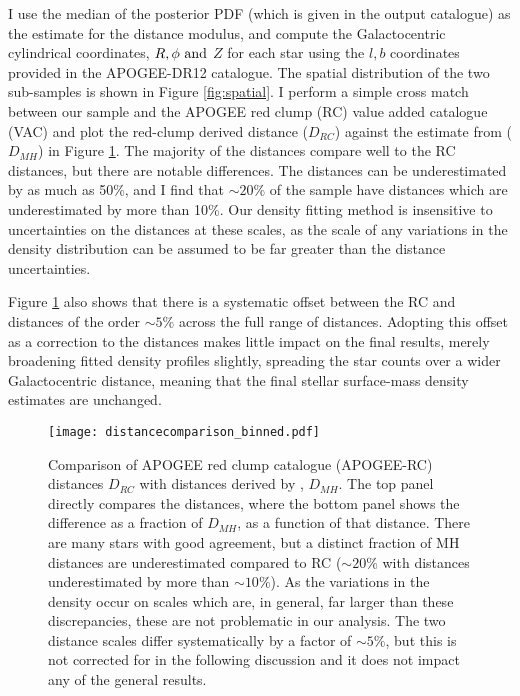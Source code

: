 I use the median of the posterior PDF (which is given in the output catalogue) as the estimate for the distance modulus, and compute the Galactocentric cylindrical coordinates, $R, \phi\ \rm{and}$  $Z$ for each star using the $l,b$ coordinates provided in the APOGEE-DR12 catalogue. The spatial distribution of the two \afe{} sub-samples is shown in Figure \ref{fig:spatial}. I perform a simple cross match between our sample and the APOGEE red clump (RC) value added catalogue (VAC) \citep{2014ApJ...790..127B} and plot the red-clump derived distance ($D_{RC}$) against the estimate from \citet{2014AJ....147..116H} ($D_{MH}$) in Figure \ref{fig:distcomp}. The majority of the \citet{2014AJ....147..116H} distances compare well to the RC distances, but there are notable differences. The \citet{2014AJ....147..116H} distances can be underestimated by as much as 50\%, and I find that $\sim20\%$ of the sample have distances which are underestimated by more than 10\%. Our density fitting method is insensitive to uncertainties on the distances at these scales, as the scale of any variations in the density distribution can be assumed to be far greater than the distance uncertainties. 

 Figure \ref{fig:distcomp} also shows that there is a systematic offset between the RC and \citet{2014AJ....147..116H} distances of the order $\sim 5\%$ across the full range of distances. Adopting this offset as a correction to the distances makes little impact on the final results, merely broadening fitted density profiles slightly, spreading the star counts over a wider Galactocentric distance, meaning that the final stellar surface-mass density estimates are unchanged.

\begin{figure}
 	\texttt{[image: distancecomparison\_binned.pdf]}
    \caption[Comparison of APOGEE RC catalogue distances with distances derived by \citet{2015ApJ...808..132H}, as used in Chapter \ref{chapter:apogeestruc}]{Comparison of APOGEE red clump catalogue (APOGEE-RC) distances $D_{RC}$ with distances derived by \citet{2015ApJ...808..132H}, $D_{MH}$. The top panel directly compares the distances, where the bottom panel shows the difference as a fraction of $D_{MH}$, as a function of that distance.  There are many stars with good agreement, but a distinct fraction of MH distances are underestimated compared to RC ($\sim 20\%$ with distances underestimated by more than $\sim 10\%$). As the variations in the density occur on scales which are, in general, far larger than these discrepancies, these are not problematic in our analysis. The two distance scales differ systematically by a factor of $\sim 5\%$, but this is not corrected for in the following discussion and it does not impact any of the general results.}
    \label{fig:distcomp}
 \end{figure}


